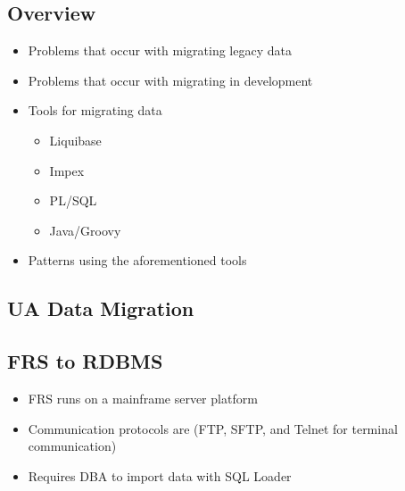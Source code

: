 \documentclass[12pt,notitlepage]{article}
\author{Leo Przybylski}
\begin{document}
  \W \begin{s5presentation}
  \maketitle

  \W \begin{s5slide}
    \W \section{Overview}
    \begin{itemize}
      \item Problems that occur with migrating legacy data
      \item Problems that occur with migrating in development
      \item Tools for migrating data
        \begin{itemize}
          \item Liquibase
          \item Impex
          \item PL/SQL
          \item Java/Groovy
        \end{itemize}
      \item Patterns using the aforementioned tools
    \end{itemize}
  \W \end {s5slide}
  
  \W \begin{s5slide}
    \W \section{UA Data Migration}


    \W \end {s5slide}

  \W \begin{s5slide}
    \W \section{FRS to RDBMS}
    \begin{itemize}
      \item FRS runs on a mainframe server platform
      \item Communication protocols are (FTP, SFTP, and Telnet for terminal communication)
      \item Requires DBA to import data with SQL Loader
    \end{itemize}
  \W \end {s5slide}


\end{s5presentation}
\end{document}
